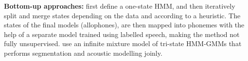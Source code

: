 
\textbf{Bottom-up approaches:} %
\textcite{varadarajan2008unsupervised} first define a one-state HMM, and then iteratively split and merge states depending on the data and according to a heuristic.
The states of the final models (allophones), are then mapped into phonemes with the help of a separate model trained using labelled speech, making the method not fully unsupervised.
\textcite{lee2012nonparametric} use an infinite mixture model of tri-state HMM-GMMs that performs segmentation and acoustic modelling joinly.
